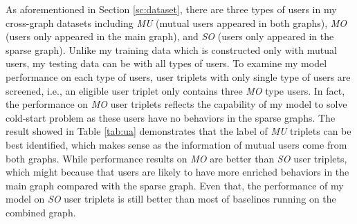 As aforementioned in Section \ref{sc:dataset}, there are three types of users in my cross-graph datasets including \textit{MU} (mutual users appeared in both graphs),  \textit{MO} (users only appeared in the main graph), and  \textit{SO} (users only appeared in the sparse graph). Unlike my training data which is constructed only with mutual users, my testing data can be with all types of users. To examine my model performance on each type of users, user triplets with only single type of users are screened, i.e., an eligible user triplet only contains three \textit{MO} type users. In fact, the performance on \textit{MO} user triplets reflects the capability of my model to solve cold-start problem as these users have no behaviors in the sparse graphs. The result showed in Table \ref{tab:ua} demonstrates that the label of \textit{MU} triplets can be best identified, which makes sense as the information of mutual users come from both graphs. While performance results on \textit{MO} are better than \textit{SO} user triplets, which might because that users are likely to have more enriched behaviors in the main graph compared with the sparse graph. Even that, the performance of my model on \textit{SO} user triplets is still better than most of baselines running on the combined graph.

